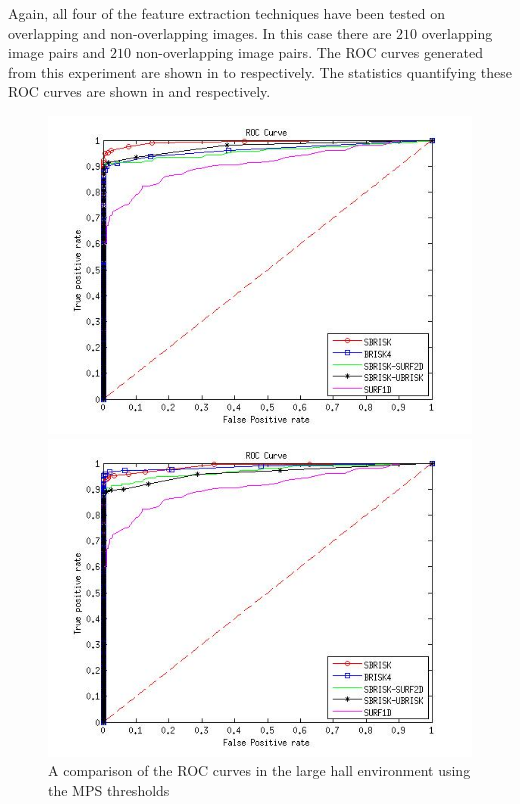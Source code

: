 \documentclass{report}
\begin{document}
Again, all four of the feature extraction techniques have been tested on overlapping and non-overlapping images. In this case there are $210$ overlapping image pairs and $210$ non-overlapping image pairs. The ROC curves generated from this experiment are shown in  to  respectively. The statistics quantifying these ROC curves are shown in  and  respectively.\\

\begin{figure}[h!]
\begin{minipage}[b]{0.5\linewidth}
\includegraphics[scale=0.4]{../Drawings/dataset3_ROC_General_KNN.jpg}
\caption{A comparison of the ROC curves in the large hall environment using the MPS thresholds}
\label{fig:compareKnnOffice3}
\end{minipage}
\hspace{0.5cm}
\begin{minipage}[b]{0.5\linewidth}
\includegraphics[scale=0.4]{../Drawings/dataset3_ROC_General_KNN_Consistent.jpg}

\end{minipage}
\end{figure}
\end{document}
